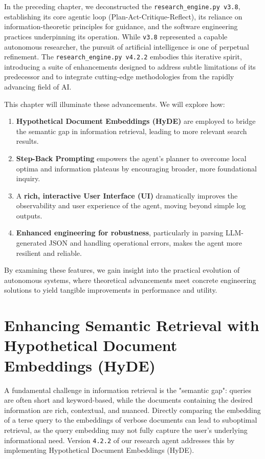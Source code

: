\documentclass[12pt, a4paper]{article}
\begin{document}
In the preceding chapter, we deconstructed the \verb|research_engine.py v3.8|, establishing its core agentic loop (Plan-Act-Critique-Reflect), its reliance on information-theoretic principles for guidance, and the software engineering practices underpinning its operation. While \verb|v3.8| represented a capable autonomous researcher, the pursuit of artificial intelligence is one of perpetual refinement. The \verb|research_engine.py v4.2.2| embodies this iterative spirit, introducing a suite of enhancements designed to address subtle limitations of its predecessor and to integrate cutting-edge methodologies from the rapidly advancing field of AI.

This chapter will illuminate these advancements. We will explore how:
\begin{enumerate}
    \item \textbf{Hypothetical Document Embeddings (HyDE)} are employed to bridge the semantic gap in information retrieval, leading to more relevant search results.
    \item \textbf{Step-Back Prompting} empowers the agent's planner to overcome local optima and information plateaus by encouraging broader, more foundational inquiry.
    \item A \textbf{rich, interactive User Interface (UI)} dramatically improves the observability and user experience of the agent, moving beyond simple log outputs.
    \item \textbf{Enhanced engineering for robustness}, particularly in parsing LLM-generated JSON and handling operational errors, makes the agent more resilient and reliable.
\end{enumerate}
By examining these features, we gain insight into the practical evolution of autonomous systems, where theoretical advancements meet concrete engineering solutions to yield tangible improvements in performance and utility.

\section{Enhancing Semantic Retrieval with Hypothetical Document Embeddings (HyDE)}

A fundamental challenge in information retrieval is the "semantic gap": queries are often short and keyword-based, while the documents containing the desired information are rich, contextual, and nuanced. Directly comparing the embedding of a terse query to the embeddings of verbose documents can lead to suboptimal retrieval, as the query embedding may not fully capture the user's underlying informational need. Version \verb|4.2.2| of our research agent addresses this by implementing Hypothetical Document Embeddings (HyDE).
\end{document}
